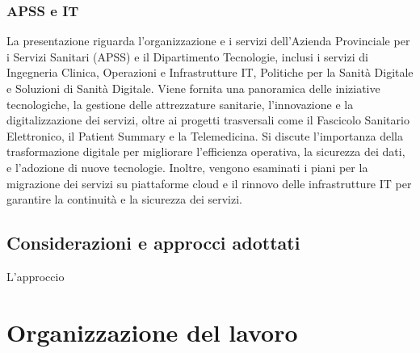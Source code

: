 \documentclass[11pt, a4paper]{article}
\theoremstyle{definition}
\begin{document}
\subsubsection{APSS e IT}
La presentazione riguarda l'organizzazione e i servizi dell'Azienda Provinciale
per i Servizi Sanitari (APSS) e il Dipartimento Tecnologie, inclusi i servizi di
Ingegneria Clinica, Operazioni e Infrastrutture IT, Politiche per la Sanità
Digitale e Soluzioni di Sanità Digitale. Viene fornita una panoramica delle
iniziative tecnologiche, la gestione delle attrezzature sanitarie, l'innovazione
e la digitalizzazione dei servizi, oltre ai progetti trasversali come il Fascicolo
Sanitario Elettronico, il Patient Summary e la Telemedicina. Si discute l'importanza
della trasformazione digitale per migliorare l'efficienza operativa, la sicurezza
dei dati, e l'adozione di nuove tecnologie. Inoltre, vengono esaminati i piani
per la migrazione dei servizi su piattaforme cloud e il rinnovo delle infrastrutture
IT per garantire la continuità e la sicurezza dei servizi.

\subsection{Considerazioni e approcci adottati}
L'approccio 


\section{Organizzazione del lavoro}
\end{document}
